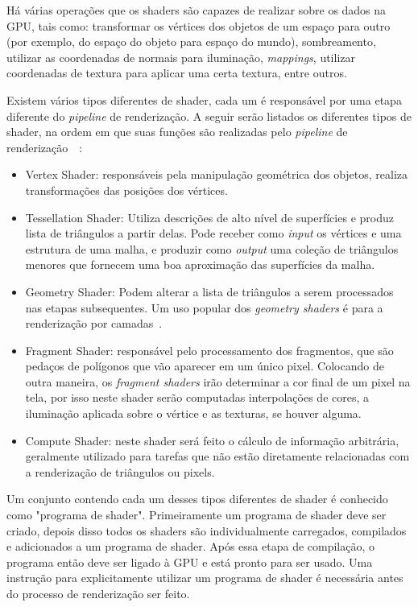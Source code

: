 Há várias operações que os shaders são capazes de realizar sobre os dados na GPU, tais 
como: transformar os vértices dos objetos de um espaço para outro (por exemplo, 
do espaço do objeto para espaço do mundo), sombreamento, utilizar as coordenadas de 
normais para iluminação, \textit{mappings}, utilizar coordenadas de textura para 
aplicar uma certa textura, entre outros.

Existem vários tipos diferentes de shader, cada um é responsável por uma etapa 
diferente do \textit{pipeline} de renderização. A seguir serão listados os diferentes 
tipos de shader, na ordem em que suas funções são realizadas pelo \textit{pipeline} de 
renderização~\cite{shreiner2013opengl}~\cite{hughes2014computer}:
\begin{itemize}
    \item Vertex Shader: responsáveis pela manipulação geométrica dos objetos, realiza 
        transformações das posições dos vértices.
    \item Tessellation Shader: Utiliza descrições de alto nível de superfícies e produz 
        lista de triângulos a partir delas. Pode receber como \textit{input} os vértices 
        e uma estrutura de uma malha, e produzir como \textit{output} uma coleção de 
        triângulos menores que fornecem uma boa aproximação das superfícies da malha.
    \item Geometry Shader: Podem alterar a lista de triângulos a serem processados nas 
        etapas subsequentes. Um uso popular dos \textit{geometry shaders} é para a 
        renderização por camadas~\cite{shreiner2013opengl}.
    \item Fragment Shader: responsável pelo processamento dos fragmentos, que são 
        pedaços de polígonos que vão aparecer em um único pixel. Colocando de outra 
        maneira, os \textit{fragment shaders} irão determinar a cor final de um pixel 
        na tela, por isso neste shader serão computadas interpolações de cores, a 
        iluminação aplicada sobre o vértice e as texturas, se houver alguma.
    \item Compute Shader: neste shader será feito o cálculo de informação arbitrária, 
        geralmente utilizado para tarefas que não estão diretamente relacionadas com a 
        renderização de triângulos ou pixels.
\end{itemize}

Um conjunto contendo cada um desses tipos diferentes de shader é conhecido como 
"programa de shader". Primeiramente um programa de shader deve ser criado, depois disso 
todos os shaders são individualmente carregados, compilados e adicionados a um 
programa de shader. Após essa etapa de compilação, o programa então deve ser ligado à 
GPU e está pronto para ser usado. Uma instrução para explicitamente utilizar um 
programa de shader é necessária antes do processo de renderização ser feito.

